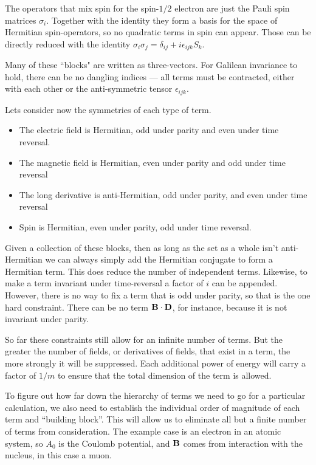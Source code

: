 The operators that mix spin for the spin-$1/2$ electron are just the Pauli spin matrices $\sigma_i$.  Together with the identity they form a basis for the space of Hermitian spin-operators, so no quadratic terms in spin can appear.  Those can be directly reduced with the identity $\sigma_i \sigma_j = \delta_{ij} + i\epsilon_{ijk} S_k$.

Many of these ``blocks" are written as three-vectors.  For Galilean invariance to hold, there can be no dangling indices --- all terms must be contracted, either with each other or the anti-symmetric tensor $\epsilon_{ijk}$.

Lets consider now the symmetries of each type of term.
\begin{itemize}
  \item The electric field is Hermitian, odd under parity and even under time reversal.  
  \item The magnetic field is Hermitian, even under parity and odd under time reversal
  \item The long derivative is anti-Hermitian, odd under parity, and even under time reversal
  \item Spin is Hermitian, even under parity, odd under time reversal.
\end{itemize}

Given a collection of these blocks, then as long as the set as a whole isn't anti-Hermitian we can always simply add the Hermitian conjugate to form a Hermitian term.  This does reduce the number of independent terms.  Likewise, to make a term invariant under time-reversal a factor of $i$ can be appended.  However, there is no way to fix a term that is odd under parity, so that is the one hard constraint.  There can be no term $\mathbf{B} \cdot \mathbf{D}$, for instance, because it is not invariant under parity.


So far these constraints still allow for an infinite number of terms.  But the greater the number of fields, or derivatives of fields, that exist in a term, the more strongly it will be suppressed.  Each additional power of energy will carry a factor of $1/m$ to ensure that the total dimension of the term is allowed.

To figure out how far down the hierarchy of terms we need to go for a particular calculation, we also need to establish the individual order of magnitude of each term and ``building block''.  This will allow us to eliminate all but a finite number of terms from consideration.  The example case is an electron in an atomic system, so $A_0$ is the Coulomb potential, and $\mathbf{B}$ comes from interaction with the nucleus, in this case a muon.

